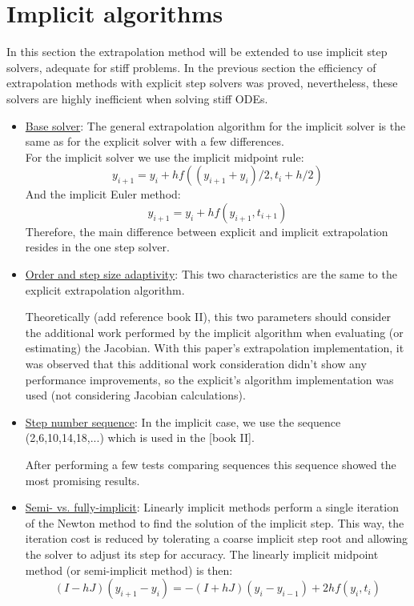 \documentclass[12pt]{article}
\begin{document}
\section{Implicit algorithms}
In this section the extrapolation method will be extended to use implicit step solvers, adequate for stiff problems. In the previous section the efficiency of extrapolation methods with explicit step solvers was proved, nevertheless, these solvers are highly inefficient when solving stiff ODEs.
\begin{itemize}
	\item \underline{Base solver}:  The general extrapolation algorithm for the implicit solver is the same as for the explicit solver with a few differences.\\
    For the implicit solver we use the implicit midpoint rule:
    	$$y_{i+1}=y_{i}+hf((y_{i+1}+y_{i})/2,t_{i}+h/2)$$
    And the implicit Euler method:
    	$$y_{i+1}=y_{i}+hf(y_{i+1},t_{i+1})$$
   Therefore, the main difference between explicit and implicit extrapolation resides in the one step solver.
   
    \item \underline{Order and step size adaptivity}:
   This two characteristics are the same to the explicit extrapolation algorithm. 
   
   Theoretically (add reference book II), this two parameters should consider the additional work performed by the implicit algorithm when evaluating (or estimating) the Jacobian. With this paper's extrapolation implementation, it was observed that this additional work consideration didn't show any performance improvements, so the explicit's algorithm implementation was used (not considering Jacobian calculations). 
    \item \underline{Step number sequence}: In the implicit case, we use the sequence (2,6,10,14,18,...) which is used in the [book II].
    
    After performing a few tests comparing sequences this sequence showed the most promising results.
    
    \item \underline{Semi- vs. fully-implicit}:
    Linearly implicit methods perform a single iteration of the Newton method to find the solution of the implicit step. This way, the iteration cost is reduced by tolerating a coarse implicit step root and allowing the solver to adjust its step for accuracy. The linearly implicit midpoint method (or semi-implicit method) is then:
        $$(I-hJ)(y_{i+1}-y_{i})=-(I+hJ)(y_{i}-y_{i-1})+2hf(y_{i},t_{i})$$


\end{itemize}
\end{document}
